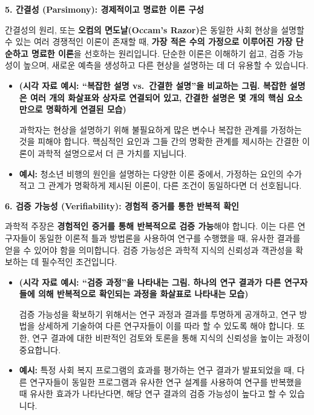 \documentclass[
  letterpaper,
]{book}
\begin{document}
\textbf{5. 간결성 (Parsimony): 경제적이고 명료한 이론 구성}

간결성의 원리, 또는 \textbf{오컴의 면도날(Occam's Razor)}은 동일한 사회
현상을 설명할 수 있는 여러 경쟁적인 이론이 존재할 때, \textbf{가장 적은
수의 가정으로 이루어진 가장 단순하고 명료한 이론}을 선호하는 원리입니다.
단순한 이론은 이해하기 쉽고, 검증 가능성이 높으며, 새로운 예측을
생성하고 다른 현상을 설명하는 데 더 유용할 수 있습니다.

\begin{itemize}
\item
  \textbf{(시각 자료 예시: ``복잡한 설명 vs.~간결한 설명''을 비교하는
  그림. 복잡한 설명은 여러 개의 화살표와 상자로 연결되어 있고, 간결한
  설명은 몇 개의 핵심 요소만으로 명확하게 연결된 모습)}

  과학자는 현상을 설명하기 위해 불필요하게 많은 변수나 복잡한 관계를
  가정하는 것을 피해야 합니다. 핵심적인 요인과 그들 간의 명확한 관계를
  제시하는 간결한 이론이 과학적 설명으로서 더 큰 가치를 지닙니다.
\item
  \textbf{예시:} 청소년 비행의 원인을 설명하는 다양한 이론 중에서,
  가정하는 요인의 수가 적고 그 관계가 명확하게 제시된 이론이, 다른
  조건이 동일하다면 더 선호됩니다.
\end{itemize}

\textbf{6. 검증 가능성 (Verifiability): 경험적 증거를 통한 반복적 확인}

과학적 주장은 \textbf{경험적인 증거를 통해 반복적으로 검증 가능}해야
합니다. 이는 다른 연구자들이 동일한 이론적 틀과 방법론을 사용하여 연구를
수행했을 때, 유사한 결과를 얻을 수 있어야 함을 의미합니다. 검증 가능성은
과학적 지식의 신뢰성과 객관성을 확보하는 데 필수적인 조건입니다.

\begin{itemize}
\item
  \textbf{(시각 자료 예시: ``검증 과정''을 나타내는 그림. 하나의 연구
  결과가 다른 연구자들에 의해 반복적으로 확인되는 과정을 화살표로
  나타내는 모습)}

  검증 가능성을 확보하기 위해서는 연구 과정과 결과를 투명하게 공개하고,
  연구 방법을 상세하게 기술하여 다른 연구자들이 이를 따라 할 수 있도록
  해야 합니다. 또한, 연구 결과에 대한 비판적인 검토와 토론을 통해 지식의
  신뢰성을 높이는 과정이 중요합니다.
\item
  \textbf{예시:} 특정 사회 복지 프로그램의 효과를 평가하는 연구 결과가
  발표되었을 때, 다른 연구자들이 동일한 프로그램과 유사한 연구 설계를
  사용하여 연구를 반복했을 때 유사한 효과가 나타난다면, 해당 연구 결과의
  검증 가능성이 높다고 할 수 있습니다.
\end{itemize}
\end{document}
